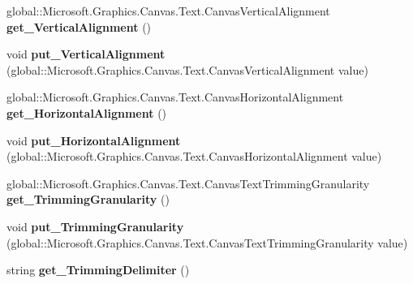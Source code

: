 \begin{DoxyCompactItemize}
global\+::\+Microsoft.\+Graphics.\+Canvas.\+Text.\+Canvas\+Vertical\+Alignment {\bfseries get\+\_\+\+Vertical\+Alignment} ()
\item 
\mbox{\label{class_microsoft_1_1_graphics_1_1_canvas_1_1_text_1_1_canvas_text_layout_a62984a3697135681afc6b8776f3df132}} 
void {\bfseries put\+\_\+\+Vertical\+Alignment} (global\+::\+Microsoft.\+Graphics.\+Canvas.\+Text.\+Canvas\+Vertical\+Alignment value)
\item 
\mbox{\label{class_microsoft_1_1_graphics_1_1_canvas_1_1_text_1_1_canvas_text_layout_a3b97a0cf1741dc7db0af0729a4a4fd99}} 
global\+::\+Microsoft.\+Graphics.\+Canvas.\+Text.\+Canvas\+Horizontal\+Alignment {\bfseries get\+\_\+\+Horizontal\+Alignment} ()
\item 
\mbox{\label{class_microsoft_1_1_graphics_1_1_canvas_1_1_text_1_1_canvas_text_layout_a58b83f1637a8f391083f54a8aa4458be}} 
void {\bfseries put\+\_\+\+Horizontal\+Alignment} (global\+::\+Microsoft.\+Graphics.\+Canvas.\+Text.\+Canvas\+Horizontal\+Alignment value)
\item 
\mbox{\label{class_microsoft_1_1_graphics_1_1_canvas_1_1_text_1_1_canvas_text_layout_a9102f8ce39e24dc440f8622fc04bab18}} 
global\+::\+Microsoft.\+Graphics.\+Canvas.\+Text.\+Canvas\+Text\+Trimming\+Granularity {\bfseries get\+\_\+\+Trimming\+Granularity} ()
\item 
\mbox{\label{class_microsoft_1_1_graphics_1_1_canvas_1_1_text_1_1_canvas_text_layout_a8bd75850c7ca9bc8d4e98c9d18e868de}} 
void {\bfseries put\+\_\+\+Trimming\+Granularity} (global\+::\+Microsoft.\+Graphics.\+Canvas.\+Text.\+Canvas\+Text\+Trimming\+Granularity value)
\item 
\mbox{\label{class_microsoft_1_1_graphics_1_1_canvas_1_1_text_1_1_canvas_text_layout_a6259a3e05a9e4d4bbd4106118e8704ac}} 
string {\bfseries get\+\_\+\+Trimming\+Delimiter} ()
\item 

\end{DoxyCompactItemize}
